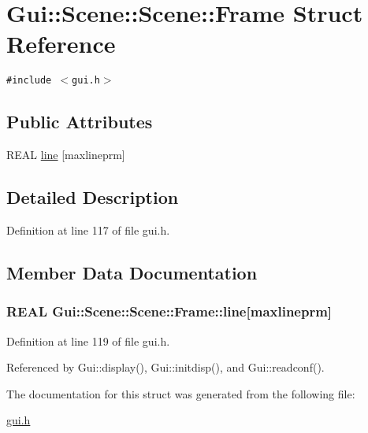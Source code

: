 \hypertarget{structGui_1_1Scene_1_1Frame}{
\section{Gui::Scene::Scene::Frame Struct Reference}
\label{structGui_1_1Scene_1_1Frame}
}
{\tt \#include $<$gui.h$>$}

\subsection*{Public Attributes}
\begin{CompactItemize}
\item 
REAL \hyperlink{structGui_1_1Scene_1_1Frame_f51950be5dc369bc8c678ea7d23d96fc}{line} \mbox{[}maxlineprm\mbox{]}
\end{CompactItemize}


\subsection{Detailed Description}


Definition at line 117 of file gui.h.

\subsection{Member Data Documentation}
\hypertarget{structGui_1_1Scene_1_1Frame_f51950be5dc369bc8c678ea7d23d96fc}{
\subsubsection[{line}]{\setlength{\rightskip}{0pt plus 5cm}REAL Gui::Scene::Scene::Frame::line\mbox{[}maxlineprm\mbox{]}}}
\label{structGui_1_1Scene_1_1Frame_f51950be5dc369bc8c678ea7d23d96fc}




Definition at line 119 of file gui.h.

Referenced by Gui::display(), Gui::initdisp(), and Gui::readconf().

The documentation for this struct was generated from the following file:\begin{CompactItemize}
\item 
\hyperlink{gui_8h}{gui.h}\end{CompactItemize}
